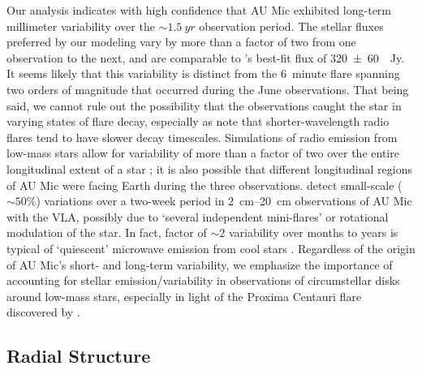 \documentclass[modern]{aastex62}
\begin{document}
Our analysis indicates with high confidence that AU Mic exhibited long-term millimeter variability over the $\sim \SI{1.5}{yr}$ observation period. 
The stellar fluxes preferred by our modeling vary by more than a factor of two from one observation to the next, and are comparable to \cite{macgregor13}'s best-fit flux of \SI{320 \pm 60}{\mu Jy}.
It seems likely that this variability is distinct from the \SI{6}{minute} flare spanning two orders of magnitude that occurred during the June observations. 
That being said, we cannot rule out the possibility that the observations caught the star in varying states of flare decay, especially as \cite{white96} note that shorter-wavelength radio flares tend to have slower decay timescales.
Simulations of radio emission from low-mass stars allow for variability of more than a factor of two over the entire longitudinal extent of a star \citep{llama18}; it is also possible that different longitudinal regions of AU Mic were facing Earth during the three observations.
\cite{cox85} detect small-scale ($\sim 50\%$) variations over  a two-week period in \SIrange{2}{20}{cm} observations of AU Mic with the VLA, possibly due to `several independent mini-flares' or rotational modulation of the star.
In fact, factor of $\sim 2$ variability over months to years is typical of `quiescent' microwave emission from cool stars \citep{guedel94}.
Regardless of the origin of AU Mic's short- and long-term variability, we emphasize the importance of accounting for stellar emission/variability in observations of circumstellar disks around low-mass stars, especially in light of the Proxima Centauri flare discovered by \cite{macgregor18}.


\subsection{Radial Structure}
\label{subsection: radial discussion}
\end{document}
